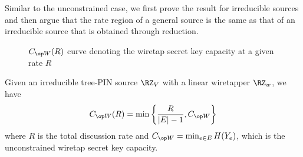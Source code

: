Similar to the unconstrained case, we first prove the result for irreducible sources and then argue that the rate region of a general source is the same as that of an irreducible source that is obtained through reduction.
\begin{figure}[h]
\centering

\caption{$\wskc(R)$ curve denoting the wiretap secret key capacity at a given rate $R$ }
\label{fig:rateregion}
 \end{figure}
\begin{theorem}\label{thm:rate:irreducible}
Given an irreducible tree-PIN source $\RZ_V$ with a linear wiretapper $\RZ_w$, we have 
\begin{align*}
\wskc(R) = \min \left\{\frac{R}{|E|-1}, \wskc\right\} 
\end{align*}
where $R$ is the total discussion rate and $\wskc =\min_{e \in E}H(Y_e)$, which is the unconstrained wiretap secret key capacity.
\end{theorem}
